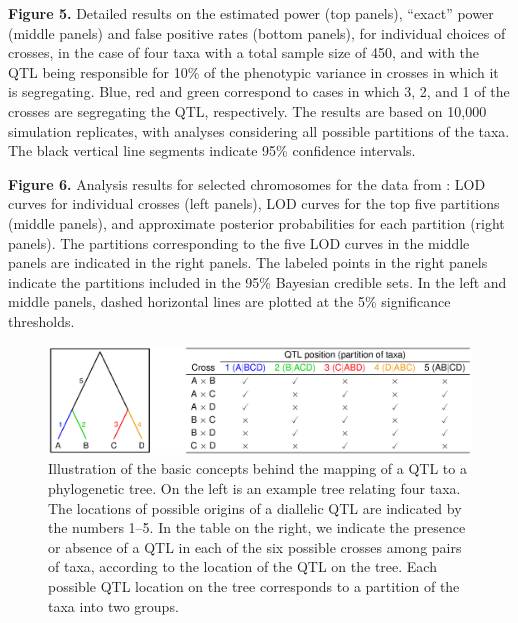 \documentclass[12pt,letterpaper]{article}
\newenvironment{hanging}
{\begin{list}{}
        {\setlength{\labelwidth}{0in}
         \setlength{\leftmargin}{1em}
         \setlength{\itemindent}{-1em}
        }
}
{\end{list}}
\begin{document}
\begin{hanging}
\item \textbf{Figure 5.}
  Detailed results on the estimated power (top panels), ``exact''
  power (middle panels) and false positive rates (bottom panels), for
  individual choices of crosses, in the case of four taxa with a total
  sample size of 450, and with the QTL being responsible for 10\% of
  the phenotypic variance in crosses in which it is segregating. Blue,
  red and green correspond to cases in which 3, 2, and 1 of the
  crosses are segregating the QTL, respectively.  The results are
  based on 10,000 simulation replicates, with analyses considering all
  possible partitions of the taxa.  The black vertical line segments
  indicate 95\% confidence intervals.


\item \textbf{Figure 6.\label{fig6legend}}
  Analysis results for selected chromosomes for the data from
  \citet{Li2005}: LOD curves for individual crosses (left panels), LOD
  curves for the top five partitions (middle panels), and approximate
  posterior probabilities for each partition (right panels).  The
  partitions corresponding to the five LOD curves in the middle panels
  are indicated in the right panels.  The labeled points in the right
  panels indicate the partitions included in the 95\% Bayesian
  credible sets.  In the left and middle panels, dashed horizontal
  lines are plotted at the 5\% significance thresholds.





\end{hanging}

\newpage


\begin{figure}
\centering
\includegraphics[width=\textwidth]{Figs/fig1.eps}

\vspace{1cm}

\caption{Illustration of the basic concepts behind the mapping of a
  QTL to a phylogenetic tree.  On the left is an example tree
  relating four taxa.  The locations of possible origins of a
  diallelic QTL are indicated by the numbers 1--5.  In the table on
  the right, we indicate the presence or absence of a QTL in each of
  the six possible crosses among pairs of taxa, according to the
  location of the QTL on the tree.  Each possible QTL location on the
  tree corresponds to a partition of the taxa into two
  groups.\label{fig:tree}}
\end{figure}
\end{document}

